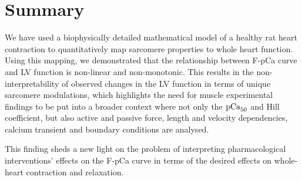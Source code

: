 \section{Summary}\label{sec:ch8summary}
We have used a biophysically detailed mathematical model of a healthy rat heart contraction to quantitatively map sarcomere properties to whole heart function. Using this mapping, we demonstrated that the relationship between F-pCa curve and LV function is non-linear and non-monotonic. This results in the non-interpretability of observed changes in the LV function in terms of unique sarcomere modulations, which highlights the need for muscle experimental findings to be put into a broader context where not only the $\textrm{pCa}_{50}$ and Hill coefficient, but also active and passive force, length and velocity dependencies, calcium transient and boundary conditions are analysed.

This finding sheds a new light on the problem of interpreting pharmacological interventions' effects on the F-pCa curve in terms of the desired effects on whole-heart contraction and relaxation.